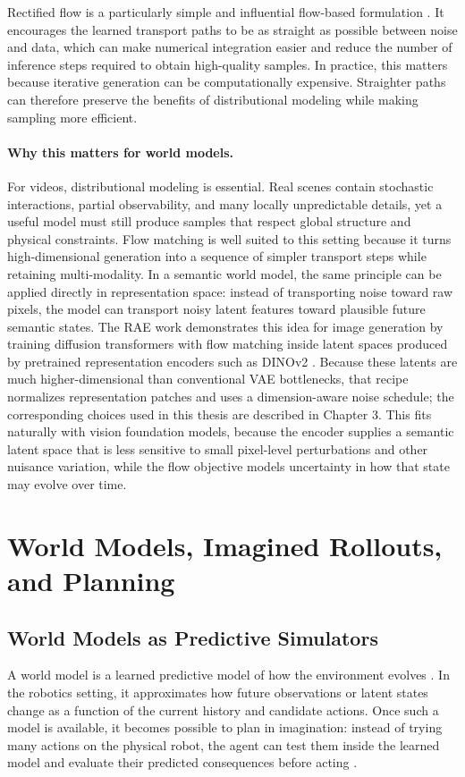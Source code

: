 \documentclass[12pt]{report}
\begin{document}
Rectified flow is a particularly simple and influential flow-based formulation \cite{liu2022rectifiedflow}. It encourages the learned transport paths to be as straight as possible between noise and data, which can make numerical integration easier and reduce the number of inference steps required to obtain high-quality samples. In practice, this matters because iterative generation can be computationally expensive. Straighter paths can therefore preserve the benefits of distributional modeling while making sampling more efficient.

\paragraph{Why this matters for world models.}
For videos, distributional modeling is essential. Real scenes contain stochastic interactions, partial observability, and many locally unpredictable details, yet a useful model must still produce samples that respect global structure and physical constraints. Flow matching is well suited to this setting because it turns high-dimensional generation into a sequence of simpler transport steps while retaining multi-modality. In a semantic world model, the same principle can be applied directly in representation space: instead of transporting noise toward raw pixels, the model can transport noisy latent features toward plausible future semantic states. The RAE work demonstrates this idea for image generation by training diffusion transformers with flow matching inside latent spaces produced by pretrained representation encoders such as DINOv2 \cite{dt_rae2025}. Because these latents are much higher-dimensional than conventional VAE bottlenecks, that recipe normalizes representation patches and uses a dimension-aware noise schedule; the corresponding choices used in this thesis are described in Chapter 3. This fits naturally with vision foundation models, because the encoder supplies a semantic latent space that is less sensitive to small pixel-level perturbations and other nuisance variation, while the flow objective models uncertainty in how that state may evolve over time.

\section{World Models, Imagined Rollouts, and Planning}
\subsection{World Models as Predictive Simulators}
A world model is a learned predictive model of how the environment evolves \cite{ha2018worldmodels,hafner2019planet}. In the robotics setting, it approximates how future observations or latent states change as a function of the current history and candidate actions. Once such a model is available, it becomes possible to plan in imagination: instead of trying many actions on the physical robot, the agent can test them inside the learned model and evaluate their predicted consequences before acting \cite{ha2018worldmodels,hafner2019dreamer,hafner2020dreamerv2,hafner2023dreamerv3}.
\end{document}
